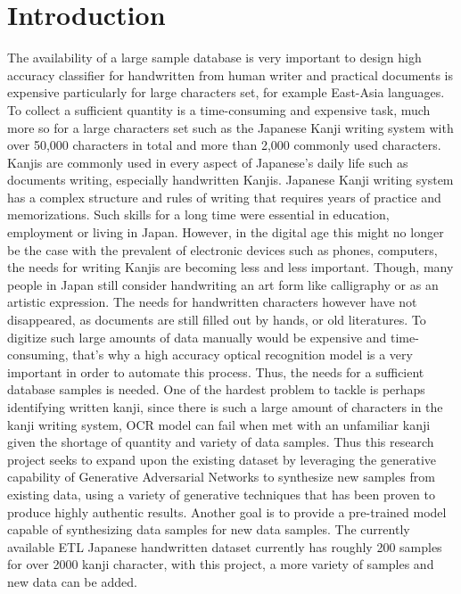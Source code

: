 \documentclass[12pt]{report}
\begin{document}
\newpage
{}
\listoffigures

\newpage
{}
\setcounter{page}{1}
\chapter{Introduction}
\label{chap:intro}

The availability of a large sample database is very important to design high accuracy
classifier for handwritten from human writer and practical documents is expensive
particularly for large characters set, for example East-Asia languages. To
collect a sufficient quantity is a time-consuming and expensive task, much more so
for a large characters set such as the Japanese Kanji writing system with over 50,000
characters in total and more than 2,000 commonly used characters. Kanjis are
commonly used in every aspect of Japanese’s daily life such as documents writing,
especially handwritten Kanjis.
Japanese Kanji writing system has a complex structure and rules of writing that
requires years of practice and memorizations. Such skills for a long time were
essential in education, employment or living in Japan. However, in the digital age
this might no longer be the case with the prevalent of electronic devices such as
phones, computers, the needs for writing Kanjis are becoming less and less important.
Though, many people in Japan still consider handwriting an art form like calligraphy
or as an artistic expression. The needs for handwritten characters however have not
disappeared, as documents are still filled out by hands, or old literatures. To digitize
such large amounts of data manually would be expensive and time-consuming, that’s
why a high accuracy optical recognition model is a very important in order to
automate this process. Thus, the needs for a sufficient database samples is needed.
One of the hardest problem to tackle is perhaps identifying written kanji, since there
is such a large amount of characters in the kanji writing system, OCR model can fail
when met with an unfamiliar kanji given the shortage of quantity and variety of data
samples. Thus this research project seeks to expand upon the existing dataset by
leveraging the generative capability of Generative Adversarial Networks to
synthesize new samples from existing data, using a variety of generative techniques
that has been proven to produce highly authentic results. Another goal is to provide
a pre-trained model capable of synthesizing data samples for new data samples.
The currently available ETL Japanese handwritten dataset \cite{etl} currently has roughly 200
samples for over 2000 kanji character, with this project, a more variety of samples
and new data can be added.
\end{document}
